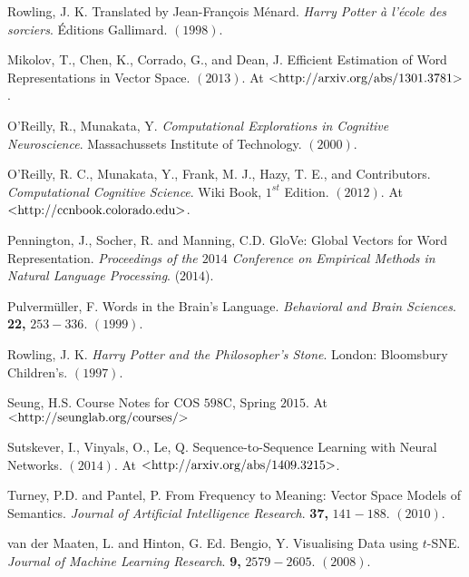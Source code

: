 \documentclass[12pt, usenames]{article}
\theoremstyle{definition}
\theoremstyle{definition}
\theoremstyle{definition}
\newcommand{\txt}[1]
{\textnormal{#1}}
\begin{document}
\begin{thebibliography}{99}
Rowling, J. K. Translated by Jean-François Ménard.
\newblock \textit{Harry Potter à l'école des sorciers}. 
\newblock Éditions Gallimard. $(1998)$.

Mikolov, T., Chen, K., Corrado, G., and Dean, J. 
\newblock Efficient Estimation of Word Representations in Vector Space. $(2013)$. 
\newblock At \href{http://arxiv.org/abs/1301.3781}{$\txt{<http://arxiv.org/abs/1301.3781>}$}. 

O'Reilly, R., Munakata, Y. 
\newblock \textit{Computational Explorations in Cognitive Neuroscience}. 
\newblock Massachussets Institute of Technology. $(2000)$. 

O'Reilly, R. C., Munakata, Y., Frank, M. J., Hazy, T. E., and Contributors.
\newblock \textit{Computational Cognitive Science}. Wiki Book, $1^{st}$ Edition. $(2012)$.
\newblock At \href{ http://ccnbook.colorado.edu}{$\txt{<http://ccnbook.colorado.edu>}$}.

Pennington, J., Socher, R. and Manning, C.D.
\newblock GloVe: Global Vectors for Word Representation. 
\newblock \textit{Proceedings of the $2014$ Conference on Empirical Methods in Natural Language Processing}. ($2014$).

Pulverm{\"u}ller, F. 
\newblock Words in the Brain's Language. 
\newblock \textit{Behavioral and Brain Sciences}. \textbf{22,} $253-336$. $(1999)$.

Rowling, J. K.
\newblock \textit{Harry Potter and the Philosopher's Stone}. 
\newblock London: Bloomsbury Children's. $(1997)$.

Seung, H.S.
\newblock Course Notes for COS $598$C, Spring $2015$.
\newblock At \href{http://seunglab.org/courses/}{$\txt{<http://seunglab.org/courses/>}$}

Sutskever, I., Vinyals, O., Le, Q. 
\newblock Sequence-to-Sequence Learning with Neural Networks. $(2014)$.
\newblock At \href{http://arxiv.org/abs/1409.3215}{$\txt{<http://arxiv.org/abs/1409.3215>}$}.

Turney, P.D. and Pantel, P. 
\newblock From Frequency to Meaning: Vector Space Models of Semantics. 
\newblock \textit{Journal of Artificial Intelligence Research}. \textbf{37,} $141-188$. $(2010)$.

van der Maaten, L. and Hinton, G. Ed. Bengio, Y. 
\newblock Visualising Data using $t$-SNE. 
\newblock \textit{Journal of Machine Learning Research}. \textbf{9,} $2579-2605$. $(2008)$.




\end{thebibliography}
\end{document}
